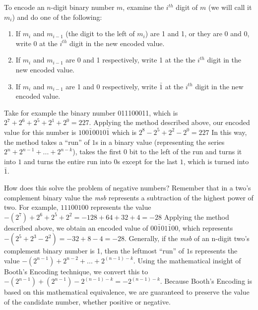 \documentclass{article}
\begin{document}
To encode an $n$-digit binary number $m$, examine the $i^{th}$ digit of $m$ (we will call it $m_i$) and do one of the following: %

\begin{enumerate}
\item If $m_i$ and $m_{i-1}$ (the digit to the left of $m_i$) are 1 and 1, or they are 0 and 0, write 0 at the $i^{th}$ digit in the new encoded value.
\item If $m_i$ and $m_{i-1}$ are 0 and 1 respectively, write 1 at the the $i^{th}$ digit in the new encoded value.
\item If $m_i$ and $m_{i-1}$ are 1 and 0 respectively, write $\bar{1}$ at the $i^{th}$ digit in the new encoded value.
\end{enumerate}

Take for example the binary number 011100011, which is $2^7 + 2^6 + 2^5 + 2^1 + 2^0 = 227$.
Applying the method described above, our encoded value for this number is $100\bar{1}0010\bar{1}$ which is $2^8 - 2^5 + 2^2 - 2^0 = 227$
In this way, the method takes a ``run'' of $1$s in a binary value (representing the series $2^{n} + 2^{n-1} + ...
+ 2^{n-k}$), takes the first 0 bit to the left of the run and turns it into $1$ and turns the entire run into $0$s except for the last $1$, which is turned into $\bar{1}$.

How does this solve the problem of negative numbers?
Remember that in a two's complement binary value the \emph{msb} represents a subtraction of the highest power of two.
For example, $11100100$ represents the value $-(2^{7}) + 2^{6} + 2^{5} + 2^{2} = -128 + 64 + 32 + 4 = -28$
Applying the method described above, we obtain an encoded value of $00\bar{1}01\bar{1}00$, which represents $-(2^{5} + 2^{3} - 2^{2}) = -32 + 8 - 4 = -28$.
Generally, if the \emph{msb} of an n-digit two's complement binary number is 1, then the leftmost ``run'' of $1$s represents the value $-(2^{n-1}) + 2^{n-2} + ...
+ 2^{(n-1)-k}$.
Using the mathematical insight of Booth's Encoding technique, we convert this to $-(2^{n-1}) + (2^{n-1}) - 2^{(n-1)-k} = -2^{(n-1)-k}$.
Because Booth's Encoding is based on this mathematical equivalence, we are guaranteed to preserve the value of the candidate number, whether positive or negative.
 
\end{document}

